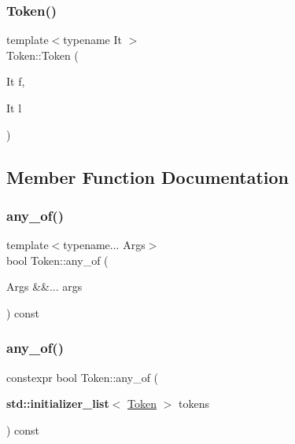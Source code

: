 \subsubsection{\texorpdfstring{Token()}{Token()}\hspace{0.1cm}{\footnotesize\ttfamily [16/16]}}
{\footnotesize\ttfamily template$<$typename It $>$ \\
Token\+::\+Token (\begin{DoxyParamCaption}\item[{It}]{f,  }\item[{It}]{l }\end{DoxyParamCaption})\hspace{0.3cm}{\ttfamily [inline]}}



\subsection{Member Function Documentation}
\mbox{\label{class_token_a6dd181cd1f4570aff7d7ddd5714ca582}} 
\subsubsection{\texorpdfstring{any\+\_\+of()}{any\_of()}\hspace{0.1cm}{\footnotesize\ttfamily [1/3]}}
{\footnotesize\ttfamily template$<$typename... Args$>$ \\
bool Token\+::any\+\_\+of (\begin{DoxyParamCaption}\item[{Args \&\&...}]{args }\end{DoxyParamCaption}) const\hspace{0.3cm}{\ttfamily [inline]}}

\mbox{\label{class_token_a0aeba20251cf6afb5f9deee77bc10e2c}} 
\subsubsection{\texorpdfstring{any\+\_\+of()}{any\_of()}\hspace{0.1cm}{\footnotesize\ttfamily [2/3]}}
{\footnotesize\ttfamily constexpr bool Token\+::any\+\_\+of (\begin{DoxyParamCaption}\item[{\textbf{ std\+::initializer\+\_\+list}$<$ \hyperlink{class_token}{Token} $>$}]{tokens }\end{DoxyParamCaption}) const\hspace{0.3cm}{\ttfamily [inline]}}

